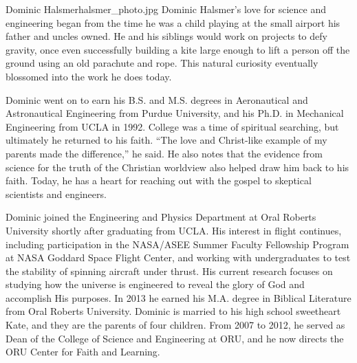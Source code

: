\begin{authorbio}{Dominic Halsmer}{halsmer_photo.jpg}{}
Dominic Halsmer's love for science and engineering began from the time he was a child playing at the small airport his father and uncles owned.  He and his siblings would work on projects to defy gravity, once even successfully building a kite large enough to lift a person off the ground using an old parachute and rope.  This natural curiosity eventually blossomed into the work he does today.  

Dominic went on to earn his B.S. and M.S. degrees in Aeronautical and Astronautical Engineering from Purdue University, and his Ph.D. in Mechanical Engineering from UCLA in 1992.  College was a time of spiritual searching, but ultimately he returned to his faith.  ``The love and Christ-like example of my parents made the difference,'' he said.  He also notes that the evidence from science for the truth of the Christian worldview also helped draw him back to his faith.  Today, he has a heart for reaching out with the gospel to skeptical scientists and engineers.

Dominic joined the Engineering and Physics Department at Oral Roberts University shortly after graduating from UCLA.  His interest in flight continues, including participation in the NASA/ASEE Summer Faculty Fellowship Program at NASA Goddard Space Flight Center, and working with undergraduates to test the stability of spinning aircraft under thrust.  His current research focuses on studying how the universe is engineered to reveal the glory of God and accomplish His purposes.  In 2013 he earned his M.A. degree in Biblical Literature from Oral Roberts University.  Dominic is married to his high school sweetheart Kate, and they are the parents of four children.  From 2007 to 2012, he served as Dean of the College of Science and Engineering at ORU, and he now directs the ORU Center for Faith and Learning.


\end{authorbio}
